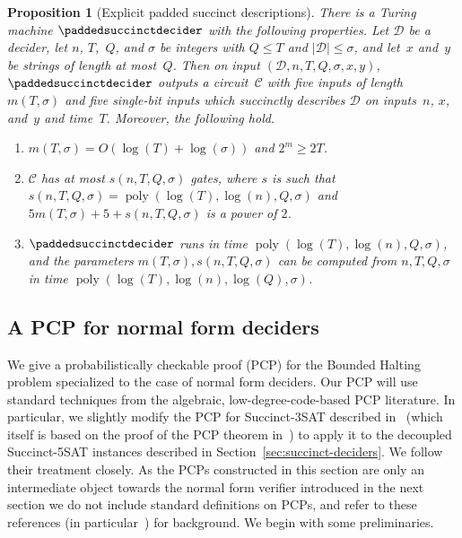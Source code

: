 \documentclass[11pt]{article}
\newtheorem{proposition}[theorem]{Proposition}
\theoremstyle{definition}
\DeclareMathOperator{\poly}{poly}
\newcommand{\decider}{\mathcal{D}}
\newcommand{\circuit}{\mathcal{C}}
\newcommand{\qlen}{Q}
\begin{document}
\begin{proposition}[Explicit padded succinct descriptions]
  \label{prop:explicit-padded-succinct-deciders}
  There is a Turing machine $\paddedsuccinctdecider$ with the following
  properties.
  Let $\decider$ be a decider, let $n$, $T$,~$\qlen$, and $\sigma$ be integers
  with $\qlen \leq T$ and $|\decider| \leq \sigma$, and let~$x$ and~$y$ be
  strings of length at most~$\qlen$.
  Then on input $(\decider, n, T, \qlen, \sigma, x, y)$,
  $\paddedsuccinctdecider$ outputs a circuit~$\circuit$ with five inputs of
  length~$m(T,\sigma)$ and five single-bit inputs which succinctly describes
  $\decider$ on inputs~$n$, $x$, and~$y$ and time~$T$.
  Moreover, the following hold.
  \begin{enumerate}
  \item $m(T,\sigma) = O(\log(T)+ \log(\sigma))$ and $2^m \geq 2T$.
  \item $\circuit$ has at most $s(n,T,\qlen,\sigma)$ gates, where $s$
    is such that $s(n,T,\qlen, \sigma) = \poly(\log(T), \log(n),
    \qlen,\sigma)$ and $5m(T, \sigma) + 5 + s(n, T, \qlen,\sigma)$ is
    a power of $2$.
  \item $\paddedsuccinctdecider$ runs in time $\poly(\log(T), \log(n),
    \qlen,\sigma)$, and the parameters $m(T,\sigma), s(n, T, \qlen, \sigma)$ can
    be computed from $n, T, \qlen,\sigma$ in time $\poly(\log(T), \log(n),
    \log(\qlen),\sigma)$.
  \end{enumerate}
\end{proposition}

\subsection{A PCP for normal form deciders}
\label{sec:pcp-cktval-new}

We give a probabilistically checkable proof (PCP) for the Bounded Halting
problem specialized to the case of normal form deciders.
Our PCP will use standard techniques from the algebraic, low-degree-code-based
PCP literature.
In particular, we slightly modify the PCP for Succinct-3SAT described
in~\cite[Section 11]{NW19} (which itself is based on the proof of the PCP
theorem in~\cite{harsha2004robust}) to apply it to the decoupled Succinct-5SAT
instances described in Section~\ref{sec:succinct-deciders}.
We follow their treatment closely.
As the PCPs constructed in this section are only an intermediate object towards
the normal form verifier introduced in the next section we do not include
standard definitions on PCPs, and refer to these references (in
particular~\cite{harsha2004robust}) for background.
We begin with some preliminaries.
\end{document}
